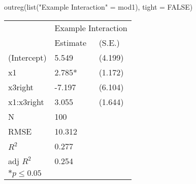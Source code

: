 \begin{Schunk}
\begin{Sinput}
 outreg(list("Example Interaction" = mod1), tight = FALSE)
\end{Sinput}
\begin{tabular}{*{3}{l}}
 \hline
                &\multicolumn{2}{c}{Example Interaction}   \\
                &Estimate &(S.E.) \\
 \hline
 \hline
  (Intercept)    &  5.549  &   (4.199) \\
  x1             &  2.785*  &   (1.172) \\
  x3right        & -7.197  &   (6.104) \\
  x1:x3right     &  3.055  &   (1.644) \\
 \hline 
 N                &100      &       \\
 RMSE            &10.312        & \\
 $R^2$           &0.277        & \\
 adj $R^2$       &0.254        & \\
 \hline
 \hline
 
 \multicolumn{2}{l}{${*}  p \le 0.05$   }\\
 \end{tabular}\end{Schunk}
